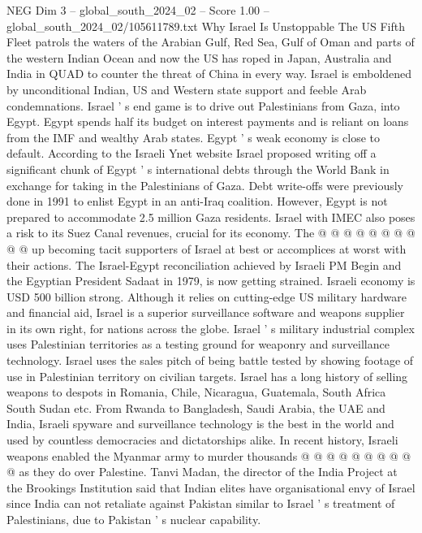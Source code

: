 \begin{textsample}{NEG Dim 3 – global\_south\_2024\_02 – Score 1.00 – global\_south\_2024\_02/105611789.txt}  \label{ex:f3_neg_097}
Why Israel Is Unstoppable The US Fifth Fleet patrols the waters of the Arabian Gulf, Red Sea, Gulf of Oman and parts of the western Indian Ocean and now the US has roped in Japan, Australia and India in QUAD to counter the threat of China in every way.
Israel is emboldened by unconditional Indian, US and Western state support and feeble Arab condemnations.
Israel ' s end game is to drive out Palestinians from Gaza, into Egypt.
Egypt spends half its budget on interest payments and is reliant on loans from the IMF and wealthy Arab states.
Egypt ' s weak economy is close to default.
According to the Israeli Ynet website Israel proposed writing off a significant chunk of Egypt ' s international debts through the World Bank in exchange for taking in the Palestinians of Gaza.
Debt write-offs were previously done in 1991 to enlist Egypt in an anti-Iraq coalition.
However, Egypt is not prepared to accommodate 2.5 million Gaza residents.
Israel with IMEC also poses a risk to its Suez Canal revenues, crucial for its economy.
The @ @ @ @ @ @ @ @ @ @ up becoming tacit supporters of Israel at best or accomplices at worst with their actions.
The Israel-Egypt reconciliation achieved by Israeli PM Begin and the Egyptian President Sadaat in 1979, is now getting strained.
Israeli economy is USD 500 billion strong.
Although it relies on cutting-edge US military hardware and financial aid, Israel is a superior surveillance software and weapons supplier in its own right, for nations across the globe.
Israel ' s military industrial complex uses Palestinian territories as a testing ground for weaponry and surveillance technology.
Israel uses the sales pitch of being battle tested by showing footage of use in Palestinian territory on civilian targets.
Israel has a long history of selling weapons to despots in Romania, Chile, Nicaragua, Guatemala, South Africa South Sudan etc.
From Rwanda to Bangladesh, Saudi Arabia, the UAE and India, Israeli spyware and surveillance technology is the best in the world and used by countless democracies and dictatorships alike.
In recent history, Israeli weapons enabled the Myanmar army to murder thousands @ @ @ @ @ @ @ @ @ @ as they do over Palestine.
Tanvi Madan, the director of the India Project at the Brookings Institution said that Indian elites have organisational envy of Israel since India can not retaliate against Pakistan similar to Israel ' s treatment of Palestinians, due to Pakistan ' s nuclear capability.

\end{textsample}
